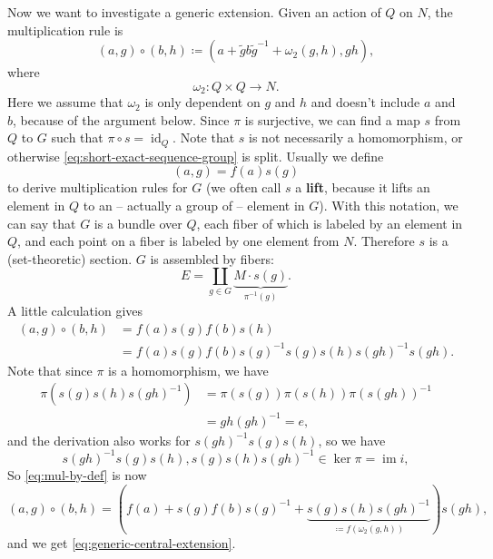 \documentclass[hyperref, a4paper]{article}
\DeclareMathOperator{\id}{id}
\newcommand*{\concept}[1]{{\textbf{#1}}}
\DeclareMathOperator{\im}{im}
\begin{document}
Now we want to investigate a generic extension. Given an action of $Q$ on $N$, the multiplication rule is 
\begin{equation}
    (a, g) \circ (b, h) \coloneqq (a + \tilde{g} b \tilde{g}^{-1} + \omega_2(g, h), gh),
    \label{eq:generic-central-extension}
\end{equation}
where
\begin{equation}
    \omega_2 : Q \times Q \to N.
\end{equation}
Here we assume that $\omega_2$ is only dependent on $g$ and $h$ and doesn't include $a$ and $b$, 
because of the argument below. Since $\pi$ is surjective, we can find a map $s$ from $Q$ to $G$ such that 
$\pi \circ s = \id_Q$. Note that $s$ is not necessarily a homomorphism, or otherwise 
\eqref{eq:short-exact-sequence-group} is split. %
Usually we define 
\begin{equation}
    (a, g) = f(a) s(g)
    \label{eq:pair-element-def}
\end{equation}
to derive multiplication rules for $G$ (we often call $s$ a \concept{lift}, because it lifts an element in $Q$ to an -- actually a group of -- element in $G$). With this notation, we can say that $G$ is a bundle over $Q$, each 
fiber of which is labeled by an element in $Q$, and each point on a fiber is labeled by one element from $N$. 
Therefore $s$ is a (set-theoretic) section. $G$ is assembled by fibers:
\begin{equation}
    E = \coprod_{g \in G} \underbrace{M \cdot s (g)}_{\pi^{-1}(g)}.
\end{equation}
A little calculation gives
\begin{equation}
    \begin{aligned}
        (a, g) \circ (b, h) &= f(a) s(g) f(b) s(h) \\
        &= f(a) s(g) f(b) s(g)^{-1} s(g) s(h) s(gh)^{-1} s(gh).
    \end{aligned}
    \label{eq:mul-by-def}
\end{equation}
Note that since $\pi$ is a homomorphism, we have 
\[
    \begin{aligned}
        \pi (s(g) s(h) s(gh)^{-1}) &= \pi(s(g)) \pi(s(h)) \pi(s(gh))^{-1} \\
        &= g h (gh)^{-1} = e,
    \end{aligned}
\]
and the derivation also works for $s(gh)^{-1} s(g) s(h)$, so we have 
\begin{equation}
    s(gh)^{-1} s(g) s(h), s(g) s(h) s(gh)^{-1} \in \ker \pi = \im i,
    \label{eq:s-inv-pi-return-n}
\end{equation}
So \eqref{eq:mul-by-def} is now 
\begin{equation}
    (a, g) \circ (b, h) = (f(a) + s(g) f(b) s(g)^{-1} + \underbrace{s(g) s(h) s(gh)^{-1}}_{\coloneqq f(\omega_2(g,h))}) s(gh),
\end{equation}
and we get \eqref{eq:generic-central-extension}.
\end{document}

